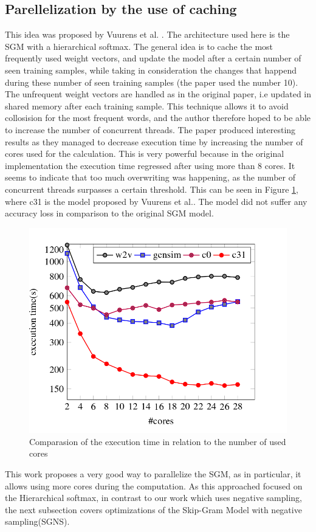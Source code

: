 \subsection{Parellelization by the use of caching}
This idea was proposed by Vuurens et al. \citep{efficient}. The architecture used here is the SGM with a hierarchical softmax. 
The general idea is to cache the most frequently used weight vectors, and update the model after a certain number of seen training samples, while taking in consideration the changes that happend during these number of seen training samples (the paper used the number 10). The unfrequent weight vectors are handled as in the original paper, i.e updated in shared memory after each training sample. This technique  allows it to avoid collosision for the most frequent words, and the author therefore hoped to be able to increase the number of concurrent threads. The paper produced interesting results as they managed to decrease execution time by increasing the number of cores used for the calculation. This is very powerful because in the original implementation the execution time regressed after using more than 8 cores. It seems to indicate that too much overwriting was happening, as the number of concurrent threads surpasses a certain threshold. This can be seen in Figure \ref{fig:efficient}, where c31 is the model proposed by Vuurens et al.\citep{efficient}. The model did not suffer any accuracy loss in comparison to the original SGM model.
\begin{figure}[ht]
\centering
\includegraphics[scale=0.3]{images/cachingEfficiency.png}
\caption{Comparasion of the execution time in relation to the number of used cores \citep{efficient}}
\label{fig:efficient}
\end{figure}
This work proposes a very good way to parallelize the SGM, as in particular, it allows using more cores during the computation. As this approached focused on the Hierarchical softmax, in contrast to our work which uses negative sampling, the next subsection covers optimizations of the Skip-Gram Model with negative sampling(SGNS).


